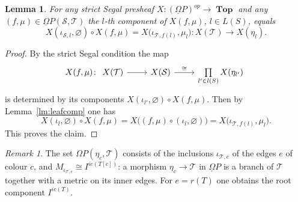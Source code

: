 \documentclass{amsart}
\newtheorem{lemma}[formula]{Lemma}
\theoremstyle{definition}
\theoremstyle{remark}
\newtheorem{remark}[formula]{Remark}
\DeclareMathOperator{\Top}{\mathbf{Top}}
\begin{document}
	\begin{lemma}\label{lm:ssegal}
		For any strict Segal presheaf $X\colon  (\underline{\Omega} P)^{op}\to \Top$ and any $(f,\mu)\in\underline{\Omega}P(\mathcal{S},\mathcal{T})$ the $l$-th component of $X(f,\mu)$, $l\in L(S)$, equals
		\[
			X(\iota_{\mathcal{S},l},\varnothing)\circ 	X(f,\mu)= X\bigl(\iota_{\mathcal{T},f(l)},\mu_l\bigr)\colon X(\mathcal{T})\to X(\eta_l).
		\]
	\end{lemma}
	\begin{proof}
		By the strict Segal condition the map
		\[
		X(f,\mu)\colon 
		\begin{tikzcd}
		X(\mathcal{T})\arrow{r} &
		X(\mathcal S)\arrow{r}{\cong} &
		\prod\limits_{l'\in l(S)}X(\eta_{l'})
		\end{tikzcd}
		\] 
		is determined by its components
		$X(\iota_{l'},\varnothing)\circ X(f,\mu)$.
		Then by Lemma~\ref{lm:leafcomp} one has
		\[
		X(\iota_l,\varnothing)\circ 		X(f,\mu)=X\bigl((f,\mu)\circ(\iota_l,\varnothing)\bigr)=
		X\bigl(\iota_{\mathcal{T}, 		f(l)},\mu_l\bigr).
		\]
		This proves the claim.
	\end{proof}

	\begin{remark}\label{rm:etacomponents}
		The set $\Omega P(\eta_c,\mathcal{T})$ consists of the inclusions $\iota_{\mathcal{T},e}$
		of the edges $e$ of colour $c$, and $M_{\iota_{\mathcal{T},e}}\cong I^{ie(T[e])}$:
		a morphism $\eta_c\to\mathcal{T}$ in $\underline{\Omega}P$ is a branch of $\mathcal{T}$
		together with a metric on its inner edges. For $e=r(T)$ one obtains the root component
		$I^{ie(T)}$.
	\end{remark}
\end{document}
